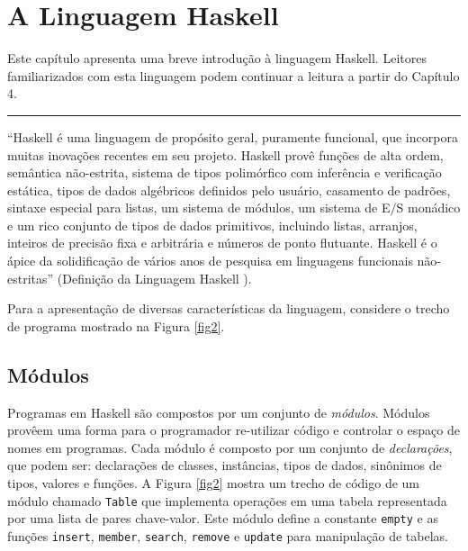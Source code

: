 \chapter{A Linguagem Haskell}\label{capintrohaskell}

Este cap\'itulo apresenta uma breve introdu\c{c}\~ao \`a linguagem Haskell.
Leitores fa\-mi\-li\-a\-ri\-za\-dos com esta linguagem podem continuar a leitura a partir do Cap\'itulo 4.

\noindent\rule{15.5cm}{0.2mm}

``Haskell \'e uma linguagem de prop\'osito geral, puramente funcional, que
incorpora muitas inova\c{c}\~oes recentes em seu projeto. Haskell prov\^e
fun\c{c}\~oes de alta ordem, sem\^antica n\~ao-estrita, sistema de tipos
polim\'orfico com infer\^encia e verifica\c{c}\~ao est\'atica, tipos de dados
alg\'ebricos definidos pelo usu\'ario, casamento de padr\~oes, sintaxe especial
para listas, um sistema de m\'odulos, um sistema de E$\slash$S mon\'adico e um
rico conjunto de tipos de dados primitivos, incluindo listas, arranjos, inteiros de 
precis\~ao fixa e arbitr\'aria e n\'umeros de ponto flutuante. Haskell \'e o
\'apice da solidifica\c{c}\~ao de v\'arios anos de pesquisa em linguagens
funcionais n\~ao-estritas'' (Defini\c{c}\~ao da Linguagem Haskell \cite{Haskell98}).

Para a apresenta\c{c}\~ao de diversas caracter\'isticas da linguagem, considere
o trecho de programa mostrado na Figura \ref{fig2}.

\section{M\'odulos}

Programas em Haskell s\~ao compostos por um conjunto de \textit{m\'odulos}.
M\'odulos prov\^eem uma forma para o programador re-utilizar c\'odigo e
controlar o espa\c{c}o de nomes em programas. Cada m\'odulo \'e composto
por um conjunto de \emph{declara\c{c}\~oes}, que podem ser: declara\c{c}\~oes de
classes, inst\^ancias, tipos de dados, sin\^onimos de tipos, valores e
fun\c{c}\~oes. A Figura \ref{fig2} mostra um trecho de c\'odigo
de um m\'odulo chamado \texttt{Table} que implementa opera\c{c}\~oes em uma tabela representada por
uma lista de pares chave-valor. Este m\'odulo define a constante
\texttt{empty} e as fun\c{c}\~oes \texttt{insert},
\texttt{member}, \texttt{search}, \texttt{remove} e \texttt{update} 
para manipula\c{c}\~ao de tabelas.

